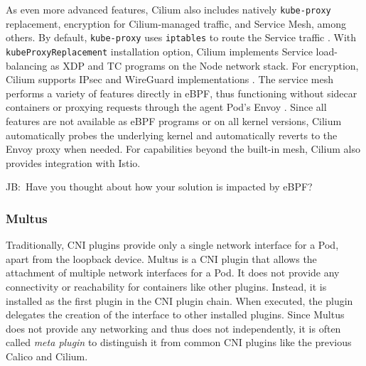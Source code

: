 \documentclass[english, 12pt, a4paper, sci, utf8, a-2b, online]{aaltothesis}
\newcommand{\mycomment}[3]{\textcolor{#1}{#2:~#3}}
\newcommand{\jb}[1]{\noindent\mycomment{aaltoRed}{JB}{#1}}
\begin{document}
As even more advanced features, Cilium also includes natively \texttt{kube-proxy} replacement, encryption for Cilium-managed traffic, and Service Mesh, among others.
By default, \texttt{kube-proxy} uses \texttt{iptables} to route the Service traffic \cite{cilium-proxy-free}.
With \texttt{kubeProxyReplacement} installation option, Cilium implements Service load-balancing as XDP and TC programs on the Node network stack.
For encryption, Cilium supports IPsec and WireGuard implementations \cite{cilium-encryption}.
The service mesh performs a variety of features directly in eBPF, thus functioning without sidecar containers or proxying requests through the agent Pod's Envoy \cite{cilium-service-mesh}.
Since all features are not available as eBPF programs or on all kernel versions,  Cilium automatically probes the underlying kernel and automatically reverts to the Envoy proxy when needed.
For capabilities beyond the built-in mesh, Cilium also provides integration with Istio.

\jb{Have you thought about how your solution is impacted by eBPF?}

\subsubsection{Multus}

Traditionally, CNI plugins provide only a single network interface for a Pod, apart from the loopback device.
Multus \cite{multus-cni} is a CNI plugin that allows the attachment of multiple network interfaces for a Pod.
It does not provide any connectivity or reachability for containers like other plugins.
Instead, it is installed as the first plugin in the CNI plugin chain.
When executed, the plugin delegates the creation of the interface to other installed plugins.
Since Multus does not provide any networking and thus does not independently, it is often called \emph{meta plugin} to distinguish it from common CNI plugins like the previous Calico and Cilium.
\end{document}
